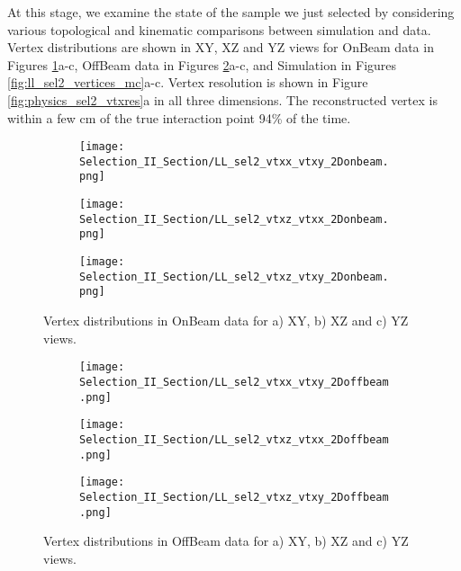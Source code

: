 At this stage, we examine the state of the sample we just selected by considering various topological and kinematic comparisons between simulation and data.  Vertex distributions are shown in XY, XZ and YZ views for OnBeam data in Figures \ref{fig:ll_sel2_vertices_onbeam}a-c, OffBeam data in Figures \ref{fig:ll_sel2_vertices_offbeam}a-c, and Simulation in Figures \ref{fig:ll_sel2_vertices_mc}a-c.  Vertex resolution is shown in Figure \ref{fig:physics_sel2_vtxres}a in all three dimensions. The reconstructed vertex is within a few cm of the true interaction point 94\% of the time.  

\begin{figure}[h!]
\centering
  \begin{subfigure}[t]{0.26\textwidth}
    \centering
\texttt{[image: Selection\_II\_Section/LL\_sel2\_vtxx\_vtxy\_2Donbeam.png]}
    \caption{ }
  \end{subfigure} 
  \hspace{10 mm}
  \begin{subfigure}[t]{0.26\textwidth}
    \centering
\texttt{[image: Selection\_II\_Section/LL\_sel2\_vtxz\_vtxx\_2Donbeam.png]}
    \caption{ }
  \end{subfigure} 
  \hspace{10 mm}
  \begin{subfigure}[t]{0.26\textwidth}
    \centering
\texttt{[image: Selection\_II\_Section/LL\_sel2\_vtxz\_vtxy\_2Donbeam.png]}
    \caption{ }
  \end{subfigure} 

\caption{ Vertex distributions in OnBeam data for a) XY, b) XZ and c) YZ views. }
\label{fig:ll_sel2_vertices_onbeam}
\end{figure}

\begin{figure}[t!]
\centering
  \begin{subfigure}[t]{0.26\textwidth}
    \centering
\texttt{[image: Selection\_II\_Section/LL\_sel2\_vtxx\_vtxy\_2Doffbeam.png]}
    \caption{ }
  \end{subfigure} 
  \hspace{10 mm}
  \begin{subfigure}[t]{0.26\textwidth}
    \centering
\texttt{[image: Selection\_II\_Section/LL\_sel2\_vtxz\_vtxx\_2Doffbeam.png]}
    \caption{ }
  \end{subfigure} 
  \hspace{10 mm}
  \begin{subfigure}[t]{0.26\textwidth}
    \centering
\texttt{[image: Selection\_II\_Section/LL\_sel2\_vtxz\_vtxy\_2Doffbeam.png]}
    \caption{ }
  \end{subfigure} 

\caption{ Vertex distributions in OffBeam data for a) XY, b) XZ and c) YZ views. }
\label{fig:ll_sel2_vertices_offbeam}
\end{figure}

